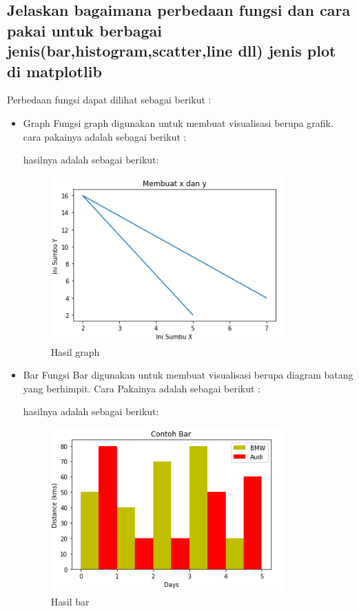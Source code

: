 \subsection{Jelaskan bagaimana perbedaan fungsi dan cara pakai untuk berbagai jenis(bar,histogram,scatter,line dll) jenis plot di matplotlib}
Perbedaan fungsi dapat dilihat sebagai berikut :
\begin{itemize}
    \item Graph\linebreak
    Fungsi graph digunakan untuk membuat visualisasi berupa grafik.
    cara pakainya adalah sebagai berikut :
    
    hasilnya adalah sebagai berikut:
    \begin{figure}[H]
        \includegraphics[width=9cm]{figures/6/Teori/1174096/3graph.png}
        \caption{Hasil graph}
        \centering
    \end{figure}

    \item Bar\linebreak 
    Fungsi Bar digunakan untuk membuat visualisasi berupa diagram batang yang berhimpit.
    Cara Pakainya adalah sebagai berikut :
    
    hasilnya adalah sebagai berikut:
    \begin{figure}[H]
        \includegraphics[width=9cm]{figures/6/Teori/1174096/3bar.png}
        \caption{Hasil bar}
        \centering
    \end{figure}


\end{itemize}
